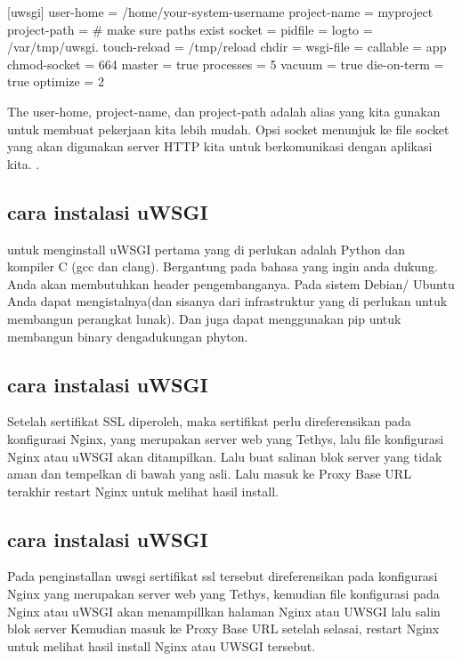 [uwsgi] 
user-home = /home/your-system-username 
project-name = myproject
project-path = %
# make sure paths exist 
socket = %
pidfile = %
logto = /var/tmp/uwsgi.%
touch-reload = /tmp/reload 
chdir = %
wsgi-file = %
callable = app 
chmod-socket = 664 
master = true 
processes = 5 
vacuum = true 
die-on-term = true 
optimize = 2

The user-home, project-name, dan project-path adalah alias yang kita gunakan untuk membuat pekerjaan kita lebih mudah. Opsi socket menunjuk ke file socket yang akan digunakan server HTTP kita untuk berkomunikasi dengan aplikasi kita. \cite{maia2015building}.

\subsection{cara instalasi uWSGI}
untuk menginstall uWSGI pertama yang di perlukan adalah Python dan kompiler C (gcc dan clang). Bergantung pada bahasa yang ingin anda dukung. Anda akan membutuhkan header pengembanganya. Pada sistem Debian/ Ubuntu Anda dapat mengistalnya(dan sisanya dari infrastruktur yang di perlukan untuk membangun perangkat lunak). Dan juga dapat menggunakan pip untuk membangun binary dengadukungan phyton\cite{berger2017usage}.

\subsection {cara instalasi uWSGI}
Setelah sertifikat SSL diperoleh, maka sertifikat perlu direferensikan pada konfigurasi Nginx, yang merupakan server web yang Tethys, lalu file konfigurasi Nginx atau uWSGI akan ditampilkan. Lalu buat salinan blok server yang tidak aman dan tempelkan di bawah yang asli. Lalu masuk ke Proxy Base URL terakhir restart Nginx untuk melihat hasil install\cite{swain2018tethys}.

\subsection {cara instalasi uWSGI}
Pada penginstallan uwsgi sertifikat ssl tersebut direferensikan pada konfigurasi Nginx yang merupakan server web yang Tethys, kemudian file konfigurasi pada Nginx atau uWSGI akan menampillkan halaman Nginx atau UWSGI lalu salin blok server Kemudian masuk ke Proxy Base URL setelah selasai, restart Nginx untuk melihat hasil install Nginx atau UWSGI tersebut\cite{swain2018tethys}.


